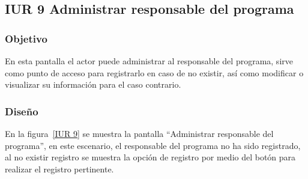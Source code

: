 \subsection{IUR 9 Administrar responsable del programa}

\subsubsection{Objetivo}


	En esta pantalla el actor  puede administrar al responsable del programa, sirve como punto de acceso para registrarlo en caso de no existir, así como modificar o visualizar su información para el caso contrario.

\subsubsection{Diseño}



    En la figura~\ref{IUR 9} se muestra la pantalla ``Administrar responsable del programa'', en este escenario, el responsable del programa no ha sido registrado, al no existir registro se muestra la opción de registro por medio del botón  para realizar el registro pertinente.

